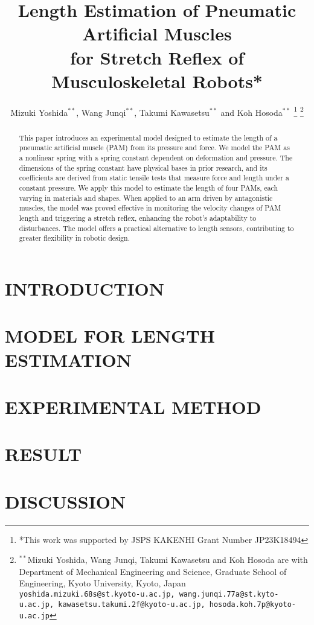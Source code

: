 \documentclass[letterpaper, 10 pt, conference]{IEEEconf}
\title{\LARGE \bf
Length Estimation of Pneumatic Artificial Muscles \\for Stretch Reflex of Musculoskeletal Robots*}
\author{Mizuki Yoshida$^{**}$, Wang Junqi$^{**}$, Takumi Kawasetsu$^{**}$ and Koh Hosoda$^{**}$%
\thanks{*This work was supported by JSPS KAKENHI Grant Number JP23K18494}%
\thanks{$^{**}$Mizuki Yoshida, Wang Junqi, Takumi Kawasetsu and Koh Hosoda are with Department of Mechanical Engineering and Science, Graduate School of Engineering, Kyoto University, Kyoto, Japan
{\tt\small yoshida.mizuki.68s@st.kyoto-u.ac.jp, wang.junqi.77a@st.kyto-u.ac.jp, kawasetsu.takumi.2f@kyoto-u.ac.jp, hosoda.koh.7p@kyoto-u.ac.jp}
 }
}
\begin{document}
\maketitle
\thispagestyle{empty}
\pagestyle{empty}


\begin{abstract}
This paper introduces an experimental model designed to estimate the length of a pneumatic artificial muscle (PAM) from its pressure and force. We model the PAM as a nonlinear spring with a spring constant dependent on deformation and pressure. The dimensions of the spring constant have physical bases in prior research, and its coefficients are derived from  static tensile tests that measure force and length under a constant pressure. We apply this model to estimate the length of four PAMs, each varying in materials and shapes. When applied to an arm driven by antagonistic muscles, the model was proved effective in monitoring the velocity changes of PAM length and triggering a stretch reflex, enhancing the robot's adaptability to disturbances.  The model offers a practical alternative to length sensors, contributing to greater flexibility in robotic design.
\end{abstract}




\section{INTRODUCTION}


\section{MODEL FOR LENGTH ESTIMATION}


\section{EXPERIMENTAL METHOD}


\section{RESULT}


\section{DISCUSSION}

\end{document}
